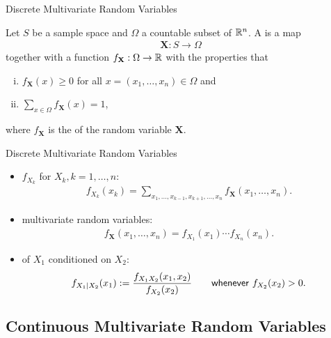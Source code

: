 \begin{frame}{Discrete Multivariate Random Variables}

\justifying
{} Let $S$ be a sample space and $\Omega$ a countable subset of $\mathbb{R}^n$. A  is a map
\begin{align*}
\mathbf{X}: S\rightarrow \Omega
\end{align*}
together with a function $f_{\mathbf{X}}: \Omega\rightarrow\mathbb{R}$ with the properties that
\begin{enumerate}[(i).]
	\item $f_{\mathbf{X}}(x) \geq 0$ for all $x = (x_1, \ldots, x_n)\in \Omega$ and
	\item $\displaystyle \sum_{x\in \Omega} f_{\mathbf{X}}(x) = 1$,
\end{enumerate}
where $f_{\mathbf{X}}$ is the  of the random variable $\mathbf{X}$.

\end{frame}

\begin{frame}{Discrete Multivariate Random Variables}

\justifying
{} 
\begin{itemize}
	\item {} $f_{X_k}$ for $X_k, k = 1, \ldots, n$:
	\begin{align*}
	f_{X_k}(x_k) = \sum_{x_1, \ldots, x_{k-1}, x_{k+1}, \ldots, x_n} f_{\mathbf{X}}(x_1, \ldots, x_n).
	\end{align*}
	\item {} multivariate random variables:
	\begin{align*}
	f_{\mathbf{X}}(x_1, \ldots, x_n) = f_{X_1}(x_1)\cdots f_{X_n}(x_n).
	\end{align*}
	\item {} of $X_1$ conditioned on $X_2$:
	\begin{align*}
	f_{X_1|X_2}(x_1) := \frac{f_{X_1X_2}(x_1, x_2)}{f_{X_2}(x_2)} \qquad \mathsf{whenever\ } f_{X_2}(x_2) > 0.
	\end{align*}
\end{itemize}

\end{frame}


\subsection{Continuous Multivariate Random Variables}



